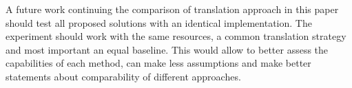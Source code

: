 \documentclass[journal]{IEEEtran}
\begin{document}
A future work continuing the comparison of translation approach in this paper should test all proposed solutions with an identical implementation.
The experiment should work with the same resources, a common translation strategy and most important an equal baseline.
This would allow to better assess the capabilities of each method, can make less assumptions and make better statements about comparability of different approaches.





\end{document}
